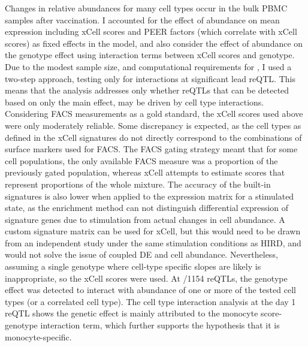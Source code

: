 Changes in relative abundances for many cell types occur in the bulk PBMC samples after vaccination.
I accounted for the effect of abundance on mean expression including xCell scores and PEER factors (which correlate with xCell scores) as fixed effects in the model,
and also consider the effect of abundance on the genotype effect using interaction terms between xCell scores and genotype.
Due to the modest sample size, and computational requirements for , I used a two-step approach, testing only for interactions at significant lead \gls{reQTL}.
This means that the analysis addresses only whether reQTLs that can be detected based on only the main effect, may be driven by cell type interactions.
%
Considering FACS measurements as a gold standard, the xCell scores used above were only moderately reliable.
Some discrepancy is expected, as the cell types as defined in the xCell signatures do not directly correspond to the combinations of surface markers used for FACS.
The FACS gating strategy meant that for some cell populations, the only available FACS measure was a proportion of the previously gated population,
whereas xCell attempts to estimate scores that represent proportions of the whole mixture.
The accuracy of the built-in signatures is also lower when applied to the expression matrix for a stimulated state,
as the enrichment method can not distinguish differential expression of signature genes due to stimulation from actual changes in cell abundance.
A custom signature matrix can be used for xCell, but this would need to be drawn from an independent study under the same stimulation conditions as \gls{HIRD}, and would not solve the issue of coupled DE and cell abundance.
Nevertheless, assuming a single genotype where cell-type specific slopes are likely is inappropriate, so the xCell scores were used.
%
At \todo{}/1154 reQTLs, the genotype effect was detected to interact with abundance of one or more of the tested cell types (or a correlated cell type).
The cell type interaction analysis at the day 1  reQTL shows the genetic effect is mainly attributed to the monocyte score-genotype interaction term, which further supports the hypothesis that it is monocyte-specific.

